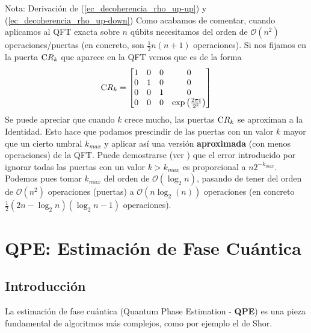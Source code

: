 \documentclass[a4paper,11pt]{book} %
\numberwithin{equation}{chapter}
\newcommand{\cg}[1]{{\rm C}#1}
\begin{document}
\begin{mybox_blue}{Nota: Derivación de (\ref{ec_decoherencia_rho_up-up}) y  (\ref{ec_decoherencia_rho_up-down})}
Como acabamos de comentar, cuando aplicamos al QFT exacta sobre $n$ qúbits necesitamos del orden de $\mathcal{O} (n^2)$ operaciones/puertas (en concreto, son $\frac{1}{2} n(n+1)$ operaciones). Si nos fijamos en la puerta $\cg{R_k}$ que aparece en la QFT vemos que es de la forma
	\begin{equation}
	\cg{R_k} = \left[ \begin{matrix}
	1 & 0 & 0 & 0 \\
	0 & 1 & 0 & 0 \\
	0 & 0 & 1 & 0 \\
	0 & 0 & 0 & \exp \left( \frac{2 \pi i}{2^k} \right)
	\end{matrix} \right]
	\end{equation}
Se puede apreciar que cuando $k$ crece mucho, las puertas $\cg{R_k}$ se aproximan a la Identidad. Esto hace que podamos prescindir de las puertas con un valor $k$ mayor que un cierto umbral $k_{max}$ y aplicar así una versión \textbf{aproximada} (con menos operaciones) de la QFT. Puede demostrarse (ver \cite{QFT-aprox}) que el error introducido por ignorar todas las puertas con un valor $k > k_{max}$ es proporcional a $n 2^{-k_{max}}$. Podemos pues tomar $k_{max}$ del orden de $\mathcal{O} (\log_2 n)$, pasando de tener del orden de $\mathcal{O} (n^2)$ operaciones (puertas) a $\mathcal{O} (n \log_2(n))$ operaciones (en concreto $\frac{1}{2} (2n-\log_2n)(\log_2n-1)$ operaciones).


\chapter{QPE: Estimación de Fase Cuántica} \label{chapter_QPE}


\section{Introducción}

La estimación de fase cuántica (Quantum Phase Estimation - \textbf{QPE}) es una pieza fundamental de algoritmos más complejos, como por ejemplo el de Shor. 


\end{mybox_blue}
\end{document}
